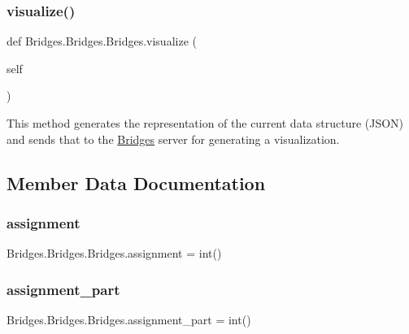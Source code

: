 \subsubsection{\texorpdfstring{visualize()}{visualize()}}
{\footnotesize\ttfamily def Bridges.\+Bridges.\+Bridges.\+visualize (\begin{DoxyParamCaption}\item[{}]{self }\end{DoxyParamCaption})}



This method generates the representation of the current data structure (J\+S\+ON) and sends that to the \mbox{\hyperlink{class_bridges_1_1_bridges_1_1_bridges}{Bridges}} server for generating a visualization. 



\subsection{Member Data Documentation}
\mbox{\label{class_bridges_1_1_bridges_1_1_bridges_a33719976eb816d13f632e9342d31b718}} 
\subsubsection{\texorpdfstring{assignment}{assignment}}
{\footnotesize\ttfamily Bridges.\+Bridges.\+Bridges.\+assignment = int()\hspace{0.3cm}{\ttfamily [static]}}

\mbox{\label{class_bridges_1_1_bridges_1_1_bridges_ae654b7f3bf01b66a13e72035309502c5}} 
\subsubsection{\texorpdfstring{assignment\+\_\+part}{assignment\_part}}
{\footnotesize\ttfamily Bridges.\+Bridges.\+Bridges.\+assignment\+\_\+part = int()\hspace{0.3cm}{\ttfamily [static]}}

